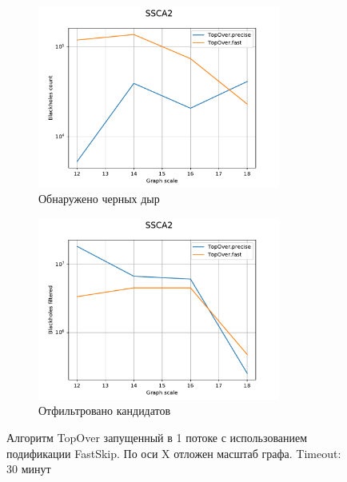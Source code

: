 \documentclass[12pt,a4paper,oneside,openany]{article}
\theoremstyle{definition}
\theoremstyle{lemma}
\theoremstyle{remark}
\begin{document}
\begin{figure}[H]
    \begin{subfigure}{.5\textwidth}
      \centering
      \includegraphics[width=8cm]{images/7_count_SSCA2.pdf}
      \caption{Обнаружено черных дыр}
      \label{fig:fastskipssca:count}
    \end{subfigure}
    \begin{subfigure}{.5\textwidth}
      \centering
      \includegraphics[width=8cm,height=6cm]{images/7_filtered_SSCA2.pdf}
      \caption{Отфильтровано кандидатов}
      \label{fig:fastskipssca:filtered}
    \end{subfigure}
    \caption{Алгоритм TopOver запущенный в 1 потоке с использованием подификации FastSkip. По оси X отложен масштаб графа. Timeout: 30 минут}
    \label{fig:fastskipssca}
\end{figure}
\end{document}
